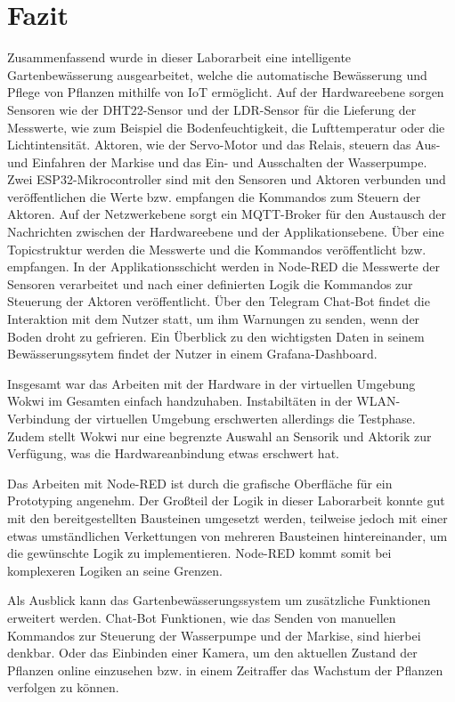 
\section{Fazit}
Zusammenfassend wurde in dieser Laborarbeit eine intelligente Gartenbewässerung ausgearbeitet, welche die automatische Bewässerung und Pflege von Pflanzen mithilfe von IoT ermöglicht. Auf der Hardwareebene sorgen Sensoren wie der DHT22-Sensor und der LDR-Sensor für die Lieferung der Messwerte, wie zum Beispiel die Bodenfeuchtigkeit, die Lufttemperatur oder die Lichtintensität. Aktoren, wie der Servo-Motor und das Relais, steuern das Aus- und Einfahren der Markise und das Ein- und Ausschalten der Wasserpumpe. Zwei ESP32-Mikrocontroller sind mit den Sensoren und Aktoren verbunden und veröffentlichen die Werte bzw. empfangen die Kommandos zum Steuern der Aktoren. Auf der Netzwerkebene sorgt ein MQTT-Broker für den Austausch der Nachrichten zwischen der Hardwareebene und der Applikationsebene. Über eine Topicstruktur werden die Messwerte und die Kommandos veröffentlicht bzw. empfangen. In der Applikationsschicht werden in Node-RED die Messwerte der Sensoren verarbeitet und nach einer definierten Logik die Kommandos zur Steuerung der Aktoren veröffentlicht. Über den Telegram Chat-Bot findet die Interaktion mit dem Nutzer statt, um ihm Warnungen zu senden, wenn der Boden droht zu gefrieren. Ein Überblick zu den wichtigsten Daten in seinem Bewässerungssytem findet der Nutzer in einem Grafana-Dashboard.

Insgesamt war das Arbeiten mit der Hardware in der virtuellen Umgebung Wokwi im Gesamten einfach handzuhaben. Instabiltäten in der WLAN-Verbindung der virtuellen Umgebung erschwerten allerdings die Testphase. Zudem stellt Wokwi nur eine begrenzte Auswahl an Sensorik und Aktorik zur Verfügung, was die Hardwareanbindung etwas erschwert hat.

Das Arbeiten mit Node-RED ist durch die grafische Oberfläche für ein Prototyping angenehm. Der Großteil der Logik in dieser Laborarbeit konnte gut mit den bereitgestellten Bausteinen umgesetzt werden, teilweise jedoch mit einer etwas umständlichen Verkettungen von mehreren Bausteinen hintereinander, um die gewünschte Logik zu implementieren. Node-RED kommt somit bei komplexeren Logiken an seine Grenzen.

Als Ausblick kann das Gartenbewässerungssystem um zusätzliche Funktionen erweitert werden. Chat-Bot Funktionen, wie das Senden von manuellen Kommandos zur Steuerung der Wasserpumpe und der Markise, sind hierbei denkbar. Oder das Einbinden einer Kamera, um den aktuellen Zustand der Pflanzen online einzusehen bzw. in einem Zeitraffer das Wachstum der Pflanzen verfolgen zu können. 